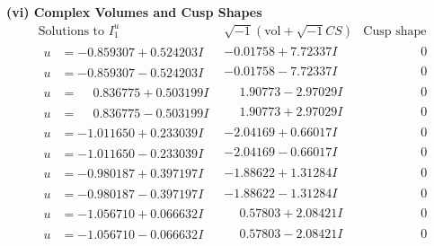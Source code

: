 \documentclass[1p]{elsarticle_modified}
\theoremstyle{definition}
\newcommand{\I}{\sqrt{-1}}
\begin{document}
\newpage\flushleft \textbf{(vi) Complex Volumes and Cusp Shapes}
$$\begin{array}{c|c|c}  
\text{Solutions to }I^u_{1}& \I (\text{vol} + \sqrt{-1}CS) & \text{Cusp shape}\\
 \hline 
\begin{aligned}
u &= -0.859307 + 0.524203 I\end{aligned}
 & -0.01758 + 7.72337 I & \phantom{-0.000000 } 0 \\ \hline\begin{aligned}
u &= -0.859307 - 0.524203 I\end{aligned}
 & -0.01758 - 7.72337 I & \phantom{-0.000000 } 0 \\ \hline\begin{aligned}
u &= \phantom{-}0.836775 + 0.503199 I\end{aligned}
 & \phantom{-}1.90773 - 2.97029 I & \phantom{-0.000000 } 0 \\ \hline\begin{aligned}
u &= \phantom{-}0.836775 - 0.503199 I\end{aligned}
 & \phantom{-}1.90773 + 2.97029 I & \phantom{-0.000000 } 0 \\ \hline\begin{aligned}
u &= -1.011650 + 0.233039 I\end{aligned}
 & -2.04169 + 0.66017 I & \phantom{-0.000000 } 0 \\ \hline\begin{aligned}
u &= -1.011650 - 0.233039 I\end{aligned}
 & -2.04169 - 0.66017 I & \phantom{-0.000000 } 0 \\ \hline\begin{aligned}
u &= -0.980187 + 0.397197 I\end{aligned}
 & -1.88622 + 1.31284 I & \phantom{-0.000000 } 0 \\ \hline\begin{aligned}
u &= -0.980187 - 0.397197 I\end{aligned}
 & -1.88622 - 1.31284 I & \phantom{-0.000000 } 0 \\ \hline\begin{aligned}
u &= -1.056710 + 0.066632 I\end{aligned}
 & \phantom{-}0.57803 + 2.08421 I & \phantom{-0.000000 } 0 \\ \hline\begin{aligned}
u &= -1.056710 - 0.066632 I\end{aligned}
 & \phantom{-}0.57803 - 2.08421 I & \phantom{-0.000000 } 0 \\ \hline\begin{aligned}

\end{aligned}
\end{array}$$
\end{document}
